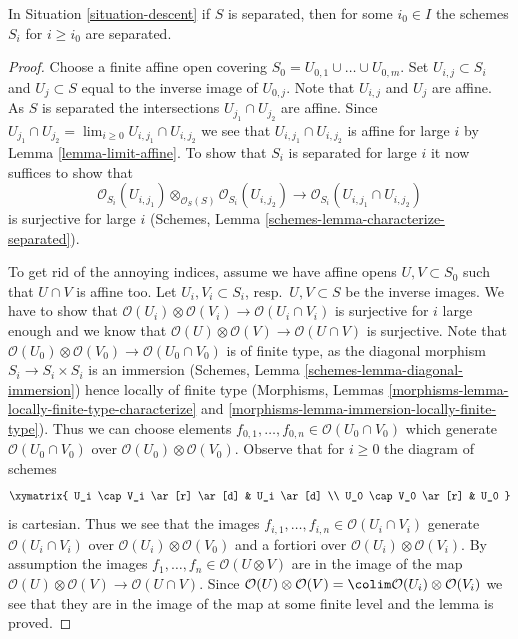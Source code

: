 \begin{lemma}
\label{lemma-limit-separated}
In Situation \ref{situation-descent} if $S$ is separated,
then for some $i_0 \in I$ the schemes $S_i$ for $i \geq i_0$
are separated.
\end{lemma}

\begin{proof}
Choose a finite affine open covering
$S_0 = U_{0, 1} \cup \ldots \cup U_{0, m}$.
Set $U_{i, j} \subset S_i$ and $U_j \subset S$
equal to the inverse image of $U_{0, j}$.
Note that $U_{i, j}$ and $U_j$ are affine. As $S$ is separated
the intersections $U_{j_1} \cap U_{j_2}$ are affine. Since
$U_{j_1} \cap U_{j_2} = \lim_{i \geq 0} U_{i, j_1} \cap U_{i, j_2}$
we see that $U_{i, j_1} \cap U_{i, j_2}$ is affine for large $i$
by Lemma \ref{lemma-limit-affine}. To show that $S_i$ is separated
for large $i$ it now suffices to show that
$$
\mathcal{O}_{S_i}(U_{i, j_1})
\otimes_{\mathcal{O}_S(S)}
\mathcal{O}_{S_i}(U_{i, j_2})
\longrightarrow
\mathcal{O}_{S_i}(U_{i, j_1} \cap U_{i, j_2})
$$
is surjective for large $i$
(Schemes, Lemma \ref{schemes-lemma-characterize-separated}).

\medskip\noindent
To get rid of the annoying indices, assume we have affine opens
$U, V \subset S_0$ such that $U \cap V$ is affine too.
Let $U_i, V_i \subset S_i$, resp.\ $U, V \subset S$ be the inverse images.
We have to show that
$\mathcal{O}(U_i) \otimes \mathcal{O}(V_i) \to
\mathcal{O}(U_i \cap V_i)$
is surjective for $i$ large enough and we know that
$\mathcal{O}(U) \otimes \mathcal{O}(V) \to \mathcal{O}(U \cap V)$
is surjective. Note that
$\mathcal{O}(U_0) \otimes \mathcal{O}(V_0) \to
\mathcal{O}(U_0 \cap V_0)$
is of finite type, as the diagonal morphism $S_i \to S_i \times S_i$
is an immersion (Schemes, Lemma \ref{schemes-lemma-diagonal-immersion})
hence locally of finite type
(Morphisms, Lemmas \ref{morphisms-lemma-locally-finite-type-characterize} and
\ref{morphisms-lemma-immersion-locally-finite-type}).
Thus we can choose elements
$f_{0, 1}, \ldots, f_{0, n} \in \mathcal{O}(U_0 \cap V_0)$
which generate $\mathcal{O}(U_0 \cap V_0)$ over
$\mathcal{O}(U_0) \otimes \mathcal{O}(V_0)$.
Observe that for $i \geq 0$ the diagram of schemes
$$
\xymatrix{
U_i \cap V_i \ar[r] \ar[d] & U_i \ar[d] \\
U_0 \cap V_0 \ar[r] & U_0
}
$$
is cartesian. Thus we see that the images
$f_{i, 1}, \ldots, f_{i, n} \in \mathcal{O}(U_i \cap V_i)$
generate $\mathcal{O}(U_i \cap V_i)$ over
$\mathcal{O}(U_i) \otimes \mathcal{O}(V_0)$
and a fortiori over
$\mathcal{O}(U_i) \otimes \mathcal{O}(V_i)$.
By assumption the images $f_1, \ldots, f_n \in \mathcal{O}(U \otimes V)$
are in the image of the map
$\mathcal{O}(U) \otimes \mathcal{O}(V) \to \mathcal{O}(U \cap V)$.
Since
$\mathcal{O}(U) \otimes \mathcal{O}(V) =
\colim \mathcal{O}(U_i) \otimes \mathcal{O}(V_i)$
we see that they are in the image of the map at some finite level
and the lemma is proved.
\end{proof}
